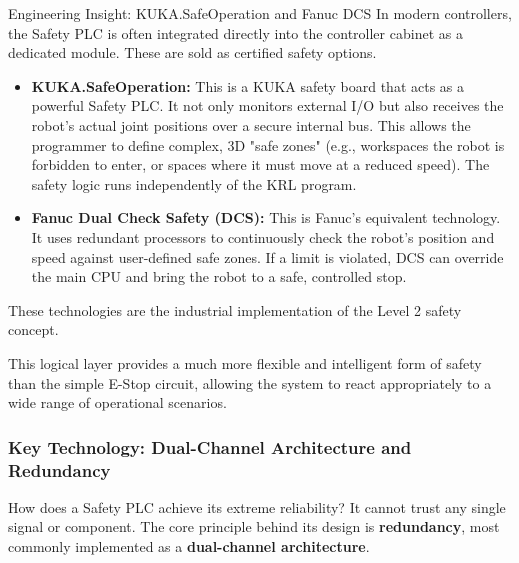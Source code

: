 \begin{tipbox}{Engineering Insight: KUKA.SafeOperation and Fanuc DCS}
    In modern controllers, the Safety PLC is often integrated directly into the controller cabinet as a dedicated module. These are sold as certified safety options.
    \begin{itemize}
        \item \textbf{KUKA.SafeOperation:} This is a KUKA safety board that acts as a powerful Safety PLC. It not only monitors external I/O but also receives the robot's actual joint positions over a secure internal bus. This allows the programmer to define complex, 3D "safe zones" (e.g., workspaces the robot is forbidden to enter, or spaces where it must move at a reduced speed). The safety logic runs independently of the KRL program.
        \item \textbf{Fanuc Dual Check Safety (DCS):} This is Fanuc's equivalent technology. It uses redundant processors to continuously check the robot's position and speed against user-defined safe zones. If a limit is violated, DCS can override the main CPU and bring the robot to a safe, controlled stop.
    \end{itemize}
    These technologies are the industrial implementation of the Level 2 safety concept.
\end{tipbox}

This logical layer provides a much more flexible and intelligent form of safety than the simple E-Stop circuit, allowing the system to react appropriately to a wide range of operational scenarios.




\subsubsection{Key Technology: Dual-Channel Architecture and Redundancy}
\label{subsubsec:dual_channel_tech}

How does a Safety PLC achieve its extreme reliability? It cannot trust any single signal or component. The core principle behind its design is \textbf{redundancy}, most commonly implemented as a \textbf{dual-channel architecture}.

